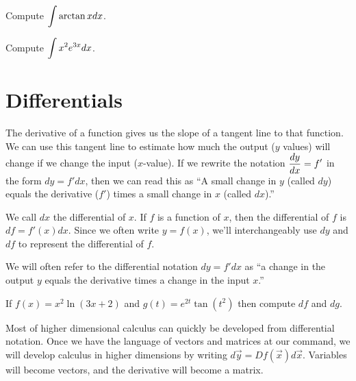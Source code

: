 \begin{problem}
Compute $\displaystyle \int \arctan x dx$.
\end{problem}

\begin{problem}
Compute $\displaystyle \int x^2 e^{3x} dx$.
\end{problem}



\section{Differentials}
The derivative of a function gives us the slope of a tangent line to that function. We can use this tangent line to estimate how much the output ($y$ values) will change if we change the input ($x$-value). If we rewrite the notation $\displaystyle\frac{dy}{dx}=f'$ in the form $dy=f' dx$, then we can read this as ``A small change in $y$ (called $dy$) equals the derivative ($f'$) times a small change in $x$ (called $dx$).'' 

\begin{definition}
We call $dx$ the differential of $x$.  If $f$ is a function of $x$, then the differential of $f$ is $df = f'(x) dx$. Since we often write $y=f(x)$, we'll interchangeably use $dy$ and $df$ to represent the differential of $f$. 

We will often refer to the differential notation $dy=f'dx$ as ``a change in the output $y$ equals the derivative times a change in the input $x$.'' 
\end{definition}

\begin{problem}
If $f(x) = x^2\ln(3x+2)$ and $g(t) = e^{2t}\tan(t^2)$ then compute $df$ and $dg$.  
\end{problem}

Most of higher dimensional calculus can quickly be developed from differential notation. Once we have the language of vectors and matrices at our command, we will develop calculus in higher dimensions by writing $d\vec y = Df(\vec x) d\vec x$.  Variables will become vectors, and the derivative will become a matrix.
 
